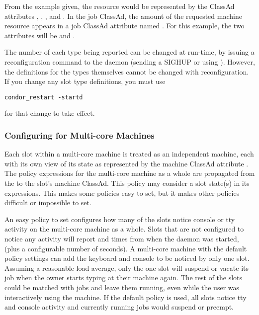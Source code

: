 \begin{description}
From the example given, the  resource would be represented by
the ClassAd attributes
, , , and .
In the job ClassAd, 
the amount of the requested machine resource appears 
in a job ClassAd attribute named .
For this example,
the two attributes will be  and .

The number of each type being
reported can be changed at run-time, by issuing a reconfiguration
command to
the  daemon (sending a SIGHUP or using ).
However, the definitions for the types themselves cannot be changed
with reconfiguration.
If you change any slot type definitions, you must use 
\begin{verbatim}
condor_restart -startd
\end{verbatim}
for that change to take effect.

\end{description}

\subsubsection{\label{sec:Config-SMP-Policy}
Configuring for Multi-core Machines}

Each slot within a multi-core machine is treated as an
independent machine,
each with its own view of its state as represented by the
machine ClassAd attribute .
The policy expressions for the multi-core machine
as a whole are propagated from the 
to the slot's machine ClassAd.
This policy may consider a slot state(s) in its expressions.
This makes some policies easy to set, but it makes
other policies difficult or impossible to set.

An easy policy to set
configures how many of the slots
notice console or tty activity on the multi-core machine as a whole.
Slots that are not configured to notice any activity will report
 and  times from when the
 daemon was started,
(plus a configurable number of seconds).
A multi-core machine with the default policy
settings can add the keyboard and console to be noticed by only one slot.
Assuming a reasonable load average,
only the one slot will suspend or vacate its job
when the owner starts typing at their machine again.
The rest of the slots could be matched with jobs and leave
them running, even while the user was interactively using the
machine. 
If the default policy is used,
all slots notice
tty and console activity
and
currently running jobs would suspend or preempt.

